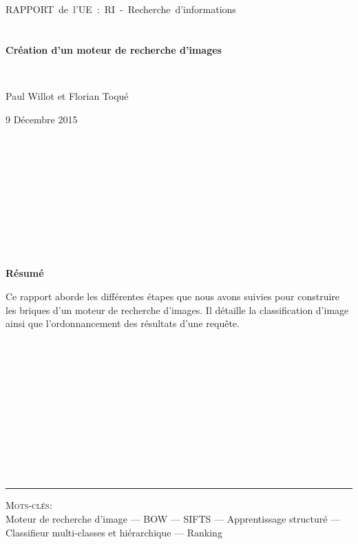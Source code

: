 \documentclass[a4paper,11pt]{report}
\begin{document}
~\\\\\\\\\\
\begin{center}
\mbox{\huge RAPPORT de l'UE : RI - Recherche d'informations}\\~\\ \mbox{ }\\ \textbf{\LARGE Création d'un moteur de recherche d'images}
\end{center}~\\
\begin{center}\large Paul Willot et Florian Toqué\end{center}
\begin{center}\large 9 Décembre 2015 \end{center}~\\\\\\\\\\\\\\\\\
\begin{center}\textbf{\Large{Résumé}}\end{center}
\large{Ce rapport aborde les différentes étapes que nous avons suivies pour construire les briques d'un moteur de recherche d'images. Il détaille la classification d'image ainsi que l'ordonnancement des résultats d'une requête.}\\\\\\\\\\\\\\\\\\\\\\\\
\rule{\linewidth}{.5pt}
\textsc{Mots-clés:}\\
Moteur de recherche d'image --- BOW --- SIFTS --- Apprentissage structuré --- Classifieur multi-classes et hiérarchique --- Ranking\\\\\\
\end{document}
